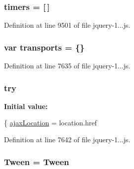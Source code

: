 \subsubsection[{timers}]{ timers = \mbox{[}$\,$\mbox{]}}\label{_scripts_2jquery-1_810_82_8js_a90bf6571856437dc2269be68a12c1d5a}


Definition at line 9501 of file jquery-\/1...\+js.

\hypertarget{_scripts_2jquery-1_810_82_8js_ae354ef69102eb621a6b2ef6c9fc4d6a3}{}
\subsubsection[{transports}]{\setlength{\rightskip}{0pt plus 5cm}var transports = \{\}}\label{_scripts_2jquery-1_810_82_8js_ae354ef69102eb621a6b2ef6c9fc4d6a3}


Definition at line 7635 of file jquery-\/1...\+js.

\hypertarget{_scripts_2jquery-1_810_82_8js_abe4cc9788f52e49485473dc699537388}{}
\subsubsection[{try}]{\setlength{\rightskip}{0pt plus 5cm}try}\label{_scripts_2jquery-1_810_82_8js_abe4cc9788f52e49485473dc699537388}
{\bfseries Initial value\+:}
\begin{DoxyCode}
\{
    \hyperlink{obj_2_release_2_package_2_package_tmp_2_scripts_2jquery-1_810_82_8js_a1661d4e1676e7c6ffde5a3cb8d8ae246}{ajaxLocation} = location.href
\end{DoxyCode}


Definition at line 7642 of file jquery-\/1...\+js.

\hypertarget{_scripts_2jquery-1_810_82_8js_a91e55267cc469e865a6a7c6cfc51c7b1}{}
\subsubsection[{Tween}]{ Tween = Tween}\label{_scripts_2jquery-1_810_82_8js_a91e55267cc469e865a6a7c6cfc51c7b1}


